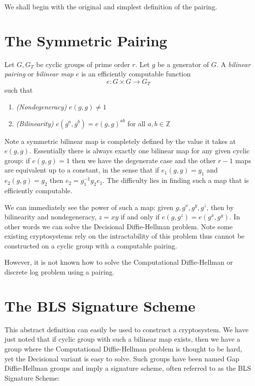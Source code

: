 We shall begin with the original and simplest definition of the pairing.

\section{\label{sec:symmetricpairing}The Symmetric Pairing}

Let $G, G_T$ be cyclic groups of prime order $r$.
Let $g$ be a generator of $G$.
A \emph{bilinear pairing} or \emph{bilinear map}
$e$ is an efficiently computable function
\[
e:G \times G \rightarrow G_T
\]
such that
\begin{enumerate}
\item
\emph{(Nondegeneracy)}
$e(g,g) \ne 1$
\item
\emph{(Bilinearity)}
$e(g^a, g^b) = e(g,g)^{a b}$ for all $a, b \in \mathbb{Z}$
\end{enumerate}

Note a symmetric bilinear map is completely defined by the value it
takes at $e(g,g)$. Essentially there is always exactly one bilinear map
for any given cyclic group: if
$e(g,g)=1$ then we have the degenerate case and the other $r-1$ maps are
equivalent up to a constant,
in the sense that if $e_1(g,g) = g_1$ and $e_2(g,g) = g_2$
then $e_2 = g_1^{-1} g_2 e_1$. The difficulty lies in finding such a map
that is efficiently computable.

We can immediately see the power of such a map: given
$g, g^x, g^y, g^z$, then by bilinearity and nondegeneracy,
$z = x y$ if and only if
$e(g, g^z) = e(g^x, g^y)$. In other words we can solve the Decisional
Diffie-Hellman problem.
Note some existing cryptosystems rely on the intractability of this
problem thus cannot be constructed on a cyclic group with
a computable pairing.

However, it is not known how to solve the Computational Diffie-Hellman
or discrete log problem using a pairing.

\section{The BLS Signature Scheme}

This abstract definition can easily be used to construct
a cryptosystem. We have just noted that if cyclic group with such a
bilinear map exists, then we have a group where the Computational
Diffie-Hellman
problem is thought to be hard, yet the Decisional variant is easy to solve.
Such groups have been named Gap Diffie-Hellman groups\cite{bls} and
imply a signature scheme, often referred to as the BLS Signature Scheme:

